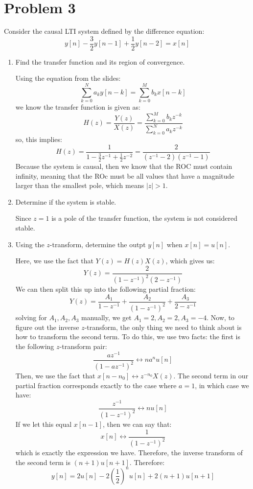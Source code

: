 \documentclass[10pt]{article}
\begin{document}
	\section*{Problem 3}
	Consider the causal LTI system defined by the difference equation:
	\[
		y[n] - \frac{3}{2}y[n - 1] + \frac{1}{2}y[n - 2] = x[n]
	\] 
	\begin{enumerate}[label=\alph*)]
		\item Find the transfer function and its region of convergence.

			\begin{solution}
				Using the equation from the slides:
				\[
					\sum_{k=0}^{N} a_k y[n - k] = \sum_{k=0}^{M} b_k x[n - k]
				\] 
				we know the transfer function is given as:
				\[
				H(z) = \frac{Y(z)}{X(z)} = \frac{\sum_{k=0}^{M} b_k z^{-k}}{\sum_{k=0}^{N} a_k z^{-k}}
				\] 
				so, this implies:
				\[
				H(z) = \frac{1}{1 - \frac{3}{2}z^{-1} + \frac{1}{2}z^{-2}} = \frac{2}{(z^{-1} - 2)(z^{-1} - 1)}
				\] 
				Because the system is causal, then we know that the ROC must contain infinity, meaning that 
				the ROc must be all values that have a magnitude larger than the smallest pole, which 
				means \( |z| > 1 \). 
			\end{solution}
		\item Determine if the system is stable.

			\begin{solution}
				Since \( z = 1 \) is a pole of the transfer function, the system is not considered stable.   
			\end{solution}
		\item Using the \( z \)-transform, determine the outpt \( y[n] \) when \( x[n] = u[n] \). 

			\begin{solution}
				Here, we use the fact that \( Y(z) = H(z) X(z) \), which gives us:
				\[
				Y(z) = \frac{2}{(1 - z^{-1})^2(2 - z^{-1})}
				\] 
				We can then split this up into the following partial fraction:
				\[
				Y(z) = \frac{A_1}{1 - z^{-1}} + \frac{A_2}{(1 - z^{-1})^2} + \frac{A_3}{2 - z^{-1}}
				\] 
				solving for \( A_1, A_2, A_3 \) manually, we get \( A_1 = 2, A_2 = 2, A_3 = -4 \). Now, to figure out 
				the inverse \( z \)-transform, the only thing we need to think about is how to transform the second 
				term. To do this, we use two facts: the first is the following \( z \)-transform pair:
				\[
					\frac{az^{-1}}{(1 - az^{-1})^2} \longleftrightarrow n a^{n}u[n]
				\] 
				Then, we use the fact that \( x[n - n_0] \longleftrightarrow z^{-n_0}X(z) \). The second term in our 
				partial fraction corresponds exactly to the case where \( a = 1 \), in which case we have:
				\[
					\frac{z^{-1}}{(1 - z^{-1})^2} \longleftrightarrow n u[n]
				\] 
				If we let this equal \( x[n - 1] \), then we can say that:
				 \[
					 x[n] \longleftrightarrow \frac{1}{(1 - z^{-1})^2}
				\] 
				which is exactly the expression we have. Therefore, the inverse transform of the second 
				term is \( (n+1)u[n + 1] \). Therefore:
				\[
					y[n] = 2u[n] - 2\left( \frac{1}{2} \right)^{n}u[n] + 2(n+1)u[n + 1]
				\] 
			\end{solution}
	\end{enumerate}
\end{document}
